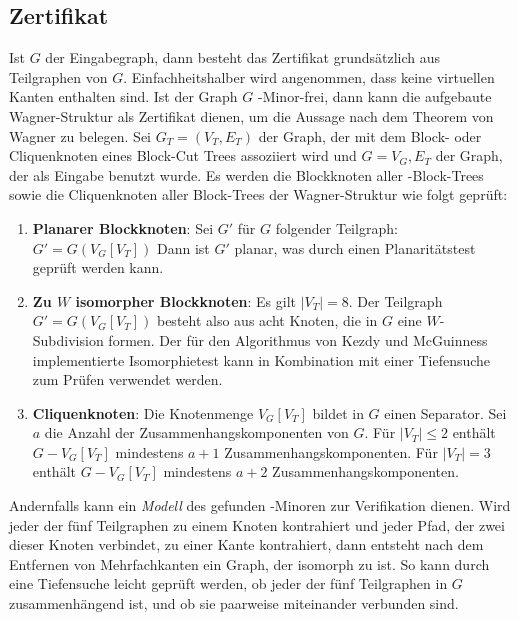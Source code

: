 \subsection{Zertifikat}
Ist $G$ der Eingabegraph, dann besteht das Zertifikat grundsätzlich aus Teilgraphen von $G$.
Einfachheitshalber wird angenommen, dass keine virtuellen Kanten enthalten sind.
Ist der Graph $G$ \kf-Minor-frei, dann kann die aufgebaute Wagner-Struktur als Zertifikat dienen, um die Aussage nach dem Theorem von Wagner \cite{Wag37} zu belegen.
Sei $G_T = (V_T, E_T)$ der Graph, der mit dem Block- oder Cliquenknoten eines Block-Cut Trees assoziiert wird und $G = V_G, E_T$ der Graph, der als Eingabe benutzt wurde.
Es werden die Blockknoten aller \dd-Block-Trees sowie die Cliquenknoten aller Block-Trees der Wagner-Struktur wie folgt geprüft:
\begin{enumerate}
  \item \textbf{Planarer Blockknoten}: Sei $G'$ für $G$ folgender Teilgraph: $G' = G(V_G[V_T])$
        Dann ist $G'$ planar, was \zB durch einen Planaritätstest geprüft werden kann.
  \item \textbf{Zu $W$ isomorpher Blockknoten}: Es gilt $\vert V_T \vert = 8$.
        Der Teilgraph $G' = G(V_G[V_T])$ besteht also aus acht Knoten, die in $G$ eine $W$-Subdivision formen.
        Der für den Algorithmus von Kezdy und McGuinness implementierte Isomorphietest kann in Kombination mit \zB einer Tiefensuche zum Prüfen verwendet werden.
  \item \textbf{Cliquenknoten}: Die Knotenmenge $V_G[V_T]$ bildet in $G$ einen Separator.
        Sei $a$ die Anzahl der Zusammenhangskomponenten von $G$.
        Für $\vert V_T \vert \leq 2$ enthält $G - V_G[V_T]$ mindestens $a+1$ Zusammenhangskomponenten.
        Für $\vert V_T \vert = 3$ enthält $G - V_G[V_T]$ mindestens $a+2$ Zusammenhangskomponenten.
\end{enumerate}

Andernfalls kann ein \emph{Modell} des gefunden \kf-Minoren zur Verifikation dienen.
Wird jeder der fünf Teilgraphen zu einem Knoten kontrahiert und jeder Pfad, der zwei dieser Knoten verbindet, zu einer Kante kontrahiert, dann entsteht nach dem Entfernen von Mehrfachkanten ein Graph, der isomorph zu \kf ist.
So kann \zB durch eine Tiefensuche leicht geprüft werden, ob jeder der fünf Teilgraphen in $G$ zusammenhängend ist, und ob sie paarweise miteinander verbunden sind.

%

